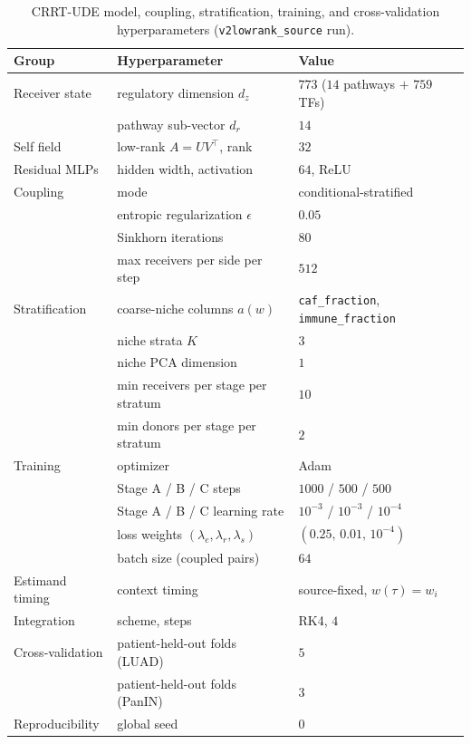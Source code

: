 \begin{table}[htbp]
  \centering
  \caption[CRRT-UDE hyperparameters and seeds]{CRRT-UDE model, coupling, stratification, training,
  and cross-validation hyperparameters (\texttt{v2lowrank\_source} run).}
  \label{tab:app-c-hyperparams}
  \begin{tabular}{lll}
    \toprule
    Group & Hyperparameter & Value \\
    \midrule
    Receiver state   & regulatory dimension $d_z$          & $773$ ($14$ pathways $+$ $759$ TFs) \\
                     & pathway sub-vector $d_r$            & $14$ \\
    Self field       & low-rank $A = UV^\top$, rank        & $32$ \\
    Residual MLPs    & hidden width, activation            & $64$, ReLU \\
    Coupling         & mode                                & conditional-stratified \\
                     & entropic regularization $\epsilon$  & $0.05$ \\
                     & Sinkhorn iterations                 & $80$ \\
                     & max receivers per side per step     & $512$ \\
    Stratification   & coarse-niche columns $a(w)$         & \texttt{caf\_fraction}, \texttt{immune\_fraction} \\
                     & niche strata $K$                    & $3$ \\
                     & niche PCA dimension                 & $1$ \\
                     & min receivers per stage per stratum & $10$ \\
                     & min donors per stage per stratum    & $2$ \\
    Training         & optimizer                           & Adam \\
                     & Stage A / B / C steps               & $1000$ / $500$ / $500$ \\
                     & Stage A / B / C learning rate       & $10^{-3}$ / $10^{-3}$ / $10^{-4}$ \\
                     & loss weights $(\lambda_e,\lambda_r,\lambda_s)$ & $(0.25,\,0.01,\,10^{-4})$ \\
                     & batch size (coupled pairs)          & $64$ \\
    Estimand timing  & context timing                      & source-fixed, $w(\tau)=w_i$ \\
    Integration      & scheme, steps                       & RK4, $4$ \\
    Cross-validation & patient-held-out folds (LUAD)       & $5$ \\
                     & patient-held-out folds (PanIN)      & $3$ \\
    Reproducibility  & global seed                         & $0$ \\
    \bottomrule
  \end{tabular}
\end{table}

